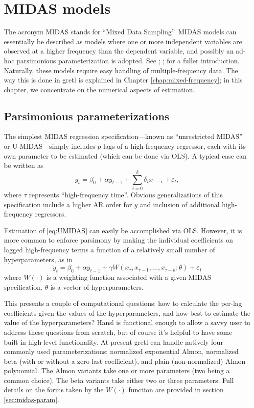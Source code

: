 \chapter{MIDAS models}
\label{chap:MIDAS}

The acronym MIDAS stands for ``Mixed Data Sampling''. MIDAS models can
essentially be described as models where one or more independent
variables are observed at a higher frequency than the dependent
variable, and possibly an ad-hoc parsimonious parameterization is
adopted. See \citealp{ghysels04}; \citealp{ghysels15};
\citealp{armesto10} for a fuller introduction. Naturally, these models
require easy handling of multiple-frequency data. The way this is done
in gretl is explained in Chapter \ref{chap:mixed-frequency}; in
this chapter, we concentrate on the numerical aspects of estimation.

\section{Parsimonious parameterizations}
\label{sec:hparams}

The simplest MIDAS regression specification---known as ``unrestricted
MIDAS'' or U-MIDAS---simply includes $p$ lags of a high-frequency
regressor, each with its own parameter to be estimated (which can be
done via OLS). A typical case can be written as
\begin{equation}
  \label{eq:UMIDAS}
  y_t = \beta_0 + \alpha y_{t-1} + \sum_{i=0}^k \delta_i x_{\tau-i} + \varepsilon_t, 
\end{equation}
where $\tau$ represents ``high-frequency time''. Obvious
generalizations of this specification include a higher AR order for
$y$ and inclusion of additional high-frequency regressors.

Estimation of \eqref{eq:UMIDAS} can easily be accomplished via
OLS. However, it is more common to enforce parsimony by making the
individual coefficients on lagged high-frequency terms a function of a
relatively small number of hyperparameters, as in
\begin{equation}
  \label{eq:MIDAS}
  y_t = \beta_0 + \alpha y_{t-1} + \gamma W(x_{\tau}, x_{\tau-1},\dots,
  x_{\tau-k}; \theta) + \varepsilon_t
\end{equation}
where $W(\cdot)$ is a weighting function associated with a given MIDAS
specification, $\theta$ is a vector of hyperparameters.

This presents a couple of computational questions: how to calculate
the per-lag coefficients given the values of the hyperparameters, and
how best to estimate the value of the hyperparameters?  Hansl is
functional enough to allow a savvy user to address these questions
from scratch, but of course it's helpful to have some built-in
high-level functionality. At present gretl can handle natively four
commonly used parameterizations: normalized exponential Almon,
normalized beta (with or without a zero last coefficient), and plain
(non-normalized) Almon polynomial. The Almon variants take one or more
parameters (two being a common choice). The beta variants take either
two or three parameters. Full details on the forms taken by the
$W(\cdot)$ function are provided in section \ref{sec:midas-param}.

